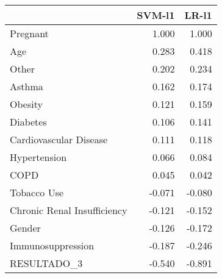 \begin{tabular}{lrr}
\toprule
{} &  SVM-l1 &  LR-l1 \\
\midrule
Pregnant                    &   1.000 &  1.000 \\
Age                         &   0.283 &  0.418 \\
Other                       &   0.202 &  0.234 \\
Asthma                      &   0.162 &  0.174 \\
Obesity                     &   0.121 &  0.159 \\
Diabetes                    &   0.106 &  0.141 \\
Cardiovascular Disease      &   0.111 &  0.118 \\
Hypertension                &   0.066 &  0.084 \\
COPD                        &   0.045 &  0.042 \\
Tobacco Use                 &  -0.071 & -0.080 \\
Chronic Renal Insufficiency &  -0.121 & -0.152 \\
Gender                      &  -0.126 & -0.172 \\
Immunosuppression           &  -0.187 & -0.246 \\
RESULTADO\_3                 &  -0.540 & -0.891 \\
\bottomrule
\end{tabular}
